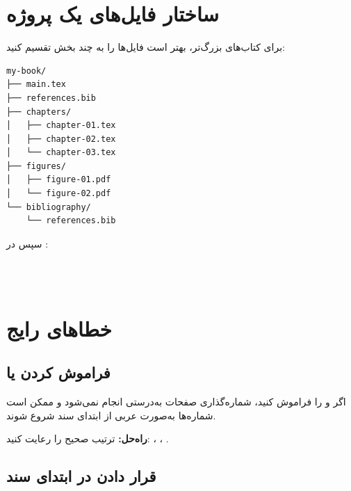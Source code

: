 \section{ساختار فایل‌های یک پروژه}
\label{sec:first-book-project-structure}

برای کتاب‌های بزرگ‌تر، بهتر است فایل‌ها را به
چند بخش تقسیم کنید:

\begin{latin}
\begin{verbatim}
my-book/
├── main.tex
├── references.bib
├── chapters/
│   ├── chapter-01.tex
│   ├── chapter-02.tex
│   └── chapter-03.tex
├── figures/
│   ├── figure-01.pdf
│   └── figure-02.pdf
└── bibliography/
    └── references.bib
\end{verbatim}
\end{latin}


سپس در :

\begin{latin}
\begin{verbatim}



\end{verbatim}
\end{latin}


\section{خطاهای رایج}
\label{sec:first-book-mistakes}

\subsection{فراموش کردن  یا }
\label{sec:first-book-mistake-frontmain}

اگر  و  را
فراموش کنید، شماره‌گذاری صفحات به‌درستی انجام
نمی‌شود و ممکن است شماره‌ها به‌صورت عربی از
ابتدای سند شروع شوند.

\textbf{راه‌حل:} ترتیب صحیح را رعایت کنید:
، ، .

\subsection{قرار دادن  در ابتدای سند}
\label{sec:first-book-mistake-backcover}

